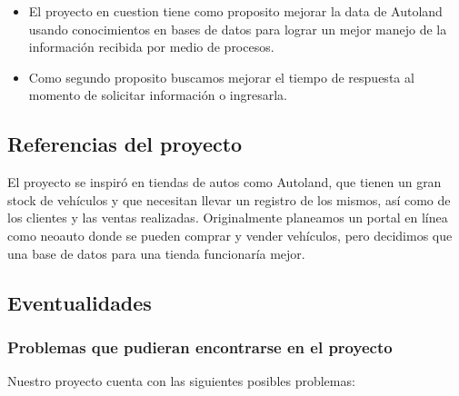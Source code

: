 \documentclass[12pt]{article}
\begin{document}
\begin{itemize}

\item El proyecto en cuestion tiene como proposito mejorar la data de Autoland usando conocimientos en bases de datos para lograr un mejor manejo de la información recibida por medio de procesos.

\item Como segundo proposito buscamos mejorar el tiempo de respuesta al momento de solicitar información o ingresarla.

\end{itemize}

\subsection{Referencias del proyecto}

El proyecto se inspiró en tiendas de autos como Autoland, que tienen un gran stock de vehículos y que necesitan llevar un registro de los mismos, así como de los clientes y las ventas realizadas. Originalmente planeamos un portal en línea como neoauto donde se pueden comprar y vender vehículos, pero decidimos que una base de datos para una tienda funcionaría mejor.

\subsection{Eventualidades}

\subsubsection{Problemas que pudieran encontrarse en el proyecto}

Nuestro proyecto cuenta con las siguientes posibles problemas:
\end{document}
